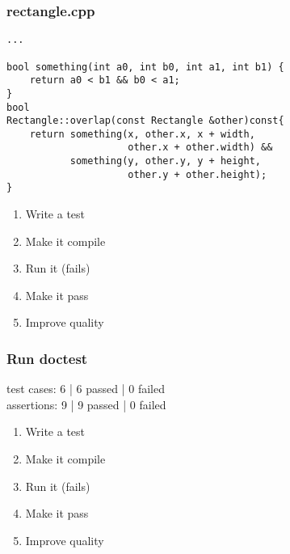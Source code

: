 \begin{frame}[fragile]
\frametitle{rectangle.cpp}
\begin{minipage}[t]{0.48\linewidth}
\begin{lstlisting}
...

bool something(int a0, int b0, int a1, int b1) {
    return a0 < b1 && b0 < a1;
}
bool 
Rectangle::overlap(const Rectangle &other)const{
    return something(x, other.x, x + width, 
                     other.x + other.width) &&
           something(y, other.y, y + height,
                     other.y + other.height);
}
\end{lstlisting}
\end{minipage}\hfill
\begin{minipage}[t]{0.28\linewidth}
  \small
  \begin{enumerate} 
    \item \textcolor{deadcolor}{Write a test}
    \item \textcolor{deadcolor}{Make it compile}
    \item \textcolor{deadcolor}{Run it (fails)}
    \item \textcolor{deadcolor}{Make it pass}
    \item \textcolor{activecolor}{Improve quality}
  \end{enumerate} 
\end{minipage}
\end{frame}

\begin{frame}[fragile]
\frametitle{Run doctest}
\begin{minipage}[t]{0.48\linewidth}
test cases: 6 | 6 passed | 0 failed\\
assertions: 9 | 9 passed | 0 failed\\
\end{minipage}\hfill
\begin{minipage}[t]{0.28\linewidth}
  \small
  \begin{enumerate} 
    \item \textcolor{deadcolor}{Write a test}
    \item \textcolor{deadcolor}{Make it compile}
    \item \textcolor{deadcolor}{Run it (fails)}
    \item \textcolor{deadcolor}{Make it pass}
    \item \textcolor{activecolor}{Improve quality}
  \end{enumerate} 
\end{minipage}
\end{frame}


